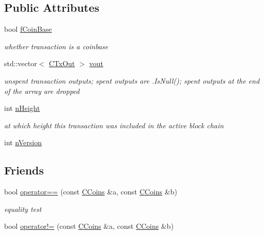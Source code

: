 \subsection*{Public Attributes}
\begin{DoxyCompactItemize}
\item 
bool \hyperlink{class_c_coins_adeedfaef84ba39b6e295d5d1fb9d8f0b}{f\+Coin\+Base}
\begin{DoxyCompactList}\small\item\em whether transaction is a coinbase \end{DoxyCompactList}\item 
std\+::vector$<$ \hyperlink{class_c_tx_out}{C\+Tx\+Out} $>$ \hyperlink{class_c_coins_a1dcea1a6da9b25642337e286f9f59b03}{vout}
\begin{DoxyCompactList}\small\item\em unspent transaction outputs; spent outputs are .Is\+Null(); spent outputs at the end of the array are dropped \end{DoxyCompactList}\item 
int \hyperlink{class_c_coins_af7396dfad71367de46f21cf92e2c70ab}{n\+Height}
\begin{DoxyCompactList}\small\item\em at which height this transaction was included in the active block chain \end{DoxyCompactList}\item 
int \hyperlink{class_c_coins_a96fea4ee8841e9ce32f60c2e7e3cf6b6}{n\+Version}
\end{DoxyCompactItemize}
\subsection*{Friends}
\begin{DoxyCompactItemize}
\item 
bool \hyperlink{class_c_coins_a77593e3db3e4b369c21a91aad2afcc05}{operator==} (const \hyperlink{class_c_coins}{C\+Coins} \&a, const \hyperlink{class_c_coins}{C\+Coins} \&b)
\begin{DoxyCompactList}\small\item\em equality test \end{DoxyCompactList}\item 
bool \hyperlink{class_c_coins_a42ef9fcc8ca59916b5fb69904db1c9bd}{operator!=} (const \hyperlink{class_c_coins}{C\+Coins} \&a, const \hyperlink{class_c_coins}{C\+Coins} \&b)
\end{DoxyCompactItemize}


